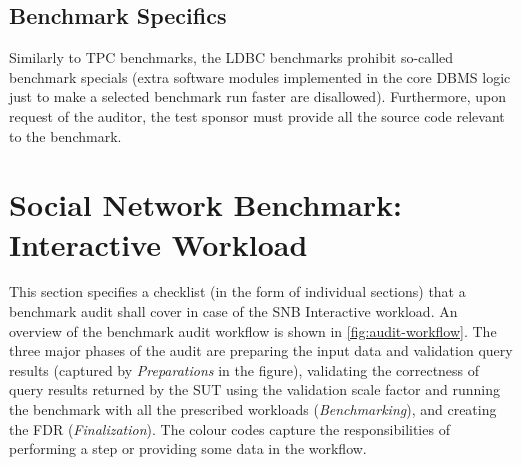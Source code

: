 \subsection{Benchmark Specifics}

Similarly to TPC benchmarks, the LDBC benchmarks prohibit so-called benchmark specials (\ie extra software modules implemented in the core DBMS logic just to make a selected benchmark run faster are disallowed). Furthermore, upon request of the auditor, the test sponsor must provide all the source code relevant to the benchmark.


\section{Social Network Benchmark: Interactive Workload}


This section specifies a checklist (in the form of individual sections) that a benchmark audit shall cover in case of the SNB Interactive workload. An overview of the benchmark audit workflow is shown in \autoref{fig:audit-workflow}. The three major phases of the audit are preparing the input data and validation query results (captured by \emph{Preparations} in the figure), validating the correctness of query results returned by the SUT using the validation scale factor and running the benchmark with all the prescribed workloads (\emph{Benchmarking}), and creating the FDR (\emph{Finalization}). The colour codes capture the responsibilities of performing a step or providing some data in the workflow.

